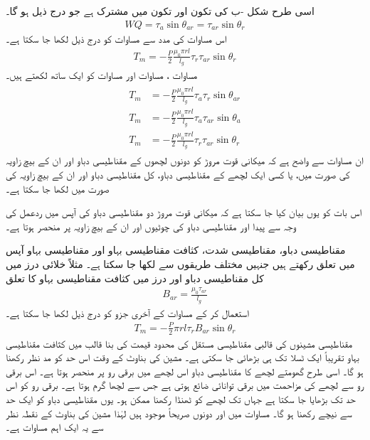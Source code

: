 اسی طرح شکل -ب  کی تکون  اور تکون  میں   مشترک ہے جو درج ذیل ہو گا۔
\begin{align}
WQ=\tau_a \sin \theta_{ar}=\tau_{ar} \sin \theta_r
\end{align}
اس مساوات کی مدد سے مساوات   کو درج ذیل لکھا جا سکتا ہے۔
\begin{align}\label{مساوات_گھومتے_مشین_مروڑ_بذریعہ_کوتوانائی_پ}
T_m=-\frac{P}{2}\frac{\mu_0 \pi r l}{l_g} \tau_r \tau_{ar}  \sin \theta_r
\end{align}
مساوات ،  مساوات   اور مساوات   کو ایک ساتھ لکھتے ہیں۔
\begin{gather}
\begin{aligned}\label{مساوات_گھومتے_مشین_مروڑ_بذریعہ_کوتوانائی_ت}
T_m&=-\frac{P}{2}\frac{\mu_0 \pi r l}{l_g} \tau_a \tau_r \sin \theta_{ar}\\
T_m&=-\frac{P}{2}\frac{\mu_0 \pi r l}{l_g} \tau_a \tau_{ar}  \sin \theta_a\\
T_m&=-\frac{P}{2}\frac{\mu_0 \pi r l}{l_g} \tau_r \tau_{ar}  \sin \theta_r
\end{aligned}
\end{gather}
ان مساوات سے  واضح ہے کہ میکانی قوت مروڑ کو دونوں لچھوں کے مقناطیسی دباو اور ان کے بیچ زاویہ کی صورت میں،  یا کسی ایک لچھے کے مقناطیسی دباو، کل مقناطیسی دباو اور ان کے بیچ زاویہ کی صورت میں لکھا جا سکتا ہے۔

اس بات کو یوں بیان کیا جا سکتا ہے کہ میکانی قوت مروڑ دو مقناطیسی دباو کی آپس میں ردعمل کی وجہ سے پیدا اور مقناطیسی دباو کی چوٹیوں اور ان کے بیچ زاویہ پر منحصر ہوتا ہے۔

مقناطیسی دباو، مقناطیسی شدت، کثافت مقناطیسی بہاو اور مقناطیسی بہاو  آپس میں تعلق رکھتے ہیں جنہیں مختلف طریقوں سے لکھا جا سکتا ہے۔ مثلاً خلائی درز میں کل مقناطیسی دباو  اور  درز میں  کثافت مقناطیسی بہاو  کا تعلق
\begin{align}
B_{ar}=\frac{\mu_0 \tau_{ar}}{l_g}
\end{align}
استعمال کر کے مساوات   کے آخری جزو کو درج ذیل لکھا جا سکتا ہے۔
\begin{align}\label{مساوات_گھومنے_مووڑ_بناوٹی_حدیں}
T_m=-\frac{P}{2} \pi r l \tau_r B_{ar} \sin \theta_r
\end{align}
مقناطیسی مشینوں کی  قالبی مقناطیسی مستقل   کی محدود قیمت کی بنا قالب میں کثافت مقناطیسی بہاو تقریباً ایک ٹسلا تک ہی بڑھائی جا سکتی ہے۔  مشین کی بناوٹ کے  وقت اس حد کو مد نظر رکھنا ہو گا۔ اسی طرح گھومتے لچھے کا مقناطیسی دباو اس لچھے میں برقی رو پر منحصر ہوتا ہے۔ اس برقی رو سے لچھے کی مزاحمت میں برقی توانائی ضائع ہوتی ہے جس سے لچھا گرم ہوتا ہے۔ برقی رو کو اس حد تک بڑھایا جا سکتا ہے جہاں تک لچھے کو ٹھنڈا رکھنا ممکن ہو۔ یوں مقناطیسی دباو کو ایک حد  سے نیچے رکھنا ہو گا۔ مساوات  میں   اور  دونوں صریحاً موجود ہیں لہٰذا مشین کی بناوٹ کے نقطہ نظر سے یہ ایک اہم مساوات ہے۔ 

